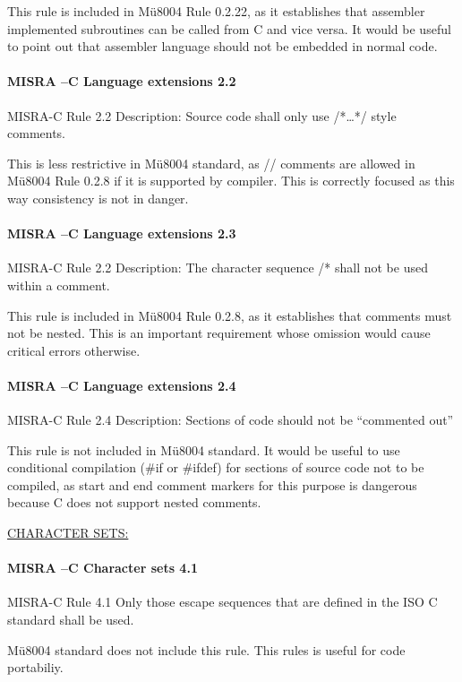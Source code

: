 This rule is included in Mü8004 Rule 0.2.22, as it establishes that assembler implemented subroutines can be called from C and vice versa. It would be useful to point out that assembler language should not be embedded in normal code.

\paragraph{MISRA –C Language extensions 2.2}
MISRA-C Rule 2.2 Description: Source code shall only use /*…*/ style comments.

This is less restrictive in Mü8004 standard, as // comments are allowed in Mü8004 Rule 0.2.8 if it is supported by compiler. This is correctly focused as this way consistency is not in danger.

\paragraph{MISRA –C Language extensions 2.3}
MISRA-C Rule 2.2 Description: The character sequence /* shall not be used within a comment.

This rule is included in Mü8004 Rule 0.2.8, as it establishes that comments must not be nested. This is an important requirement whose omission would cause critical errors otherwise.

\paragraph{MISRA –C Language extensions 2.4}
MISRA-C Rule 2.4 Description: Sections of code should not be “commented out”

This rule is not included in Mü8004 standard. It would be useful to use conditional compilation (\#if or \#ifdef) for sections of source code not to be compiled, as start and end comment markers for this purpose is dangerous because C does not support nested comments.

\begin{center}
\textsc{\underline{CHARACTER SETS:}}
\end{center}

\paragraph{MISRA –C Character sets 4.1}
MISRA-C Rule 4.1 Only those escape sequences that are defined in the ISO C
standard shall be used.

Mü8004 standard does not include this rule. This rules is useful for code portabiliy.
 
